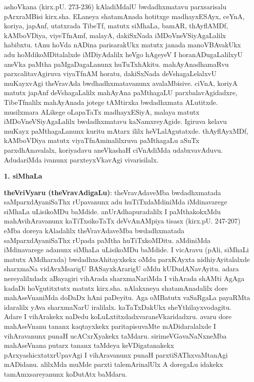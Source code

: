 ashoVkana (kirx.pU. 273-236) kAladiMdalU bwdadhxmatavu parxsarisalu pArxraMBisi kirx.sha. ELaneya shatamAnada hotitxge madhayxESAyx, ceYnA, koriya, japAnf, utatxrada TibeTf, matutx siMhaLa, bamAR, thAyflAMDf, kAMboVDiya, viyeTf\-nAmf, malayA, dakiSxNada iMDoVneVSiyAgaLalilx habibxtu. tAnu hoVda nADina pari\-sarakUkx matutx janada manoVBAvakUkx adu hoMdikoMDitalalxde iMDiyAdalilx heVgo hAgeyeV I horanADugaLalilxyU aneVka paMtha paMgaDagaLanunx huTuTx\-hAkitu. mahAyAnadhamaRvu parxcalitavAgiruva viyaTfnAM horatu, dakiSxNada deVshagaLelalxvU muKayxvAgi theVravAda bwdhadhxmatavanunx avalaMbisive. ciVnA, koriyA matutx japAnf deVshagaLalilx mahAyAna paMthagaLU parxbalavAgidadxre, TibeTfnalilx mahAyAnada jotege tAMtirxka bwdadhxmata ALutitxde. musilxmara ALikege oLapaTaTx madhayxESiyA, malaya matutx iMDoVneVSiyAgaLalilx bwdadhxmatavu kaNamxreyAgide. Igiruva kelavu muKayx paMthagaLanunx kuritu mAtarx ililx heVLalAgutatxde. thAyflAyxMDf, kAMboVDiya matutx viyaTfnAminalilxruva paMthagaLu aSuTx parxdhAnavalalx, koriyadavu aneVkashaH ciVnAdiMda udabxvavAduvu. AdudariMda ivanunx parxteyxVkavAgi vivarisilalx.

\smallskip
\begin{center}
{\textbf{\Large 1. siMhaLa}}
\end{center}

{\bf theVriVyaru (theVravAdigaLu)}: theVravAdaveMba bwdadhxmatada saMparxdAyaniSaThx rUpavanunx adu huTiTxdaMdiniMda iMdinavarege siMhaLa uLisikoMDu baMdide. anUrAdhapuradalilx I paMthakokxMdu mahAvihAravanunx kaTiTxsikoTaTx deVvAnAM\-piya tisasx (kirx.pU. 247-207) eMba doreya kAladalilx theVravAdaveMba bwdadhxmatada saMparxdAyaniSaThx rUpada paMtha huTiTxkoMDitu. aMdiniMda iMdinavarege adanunx siMhaLa uLisikoMDu baMdide. I vicAravu (pAli, siMhaLi matutx AMdharxda) bwdadhxsAhitayxkekx oMdu parxKAyxta nidhiyAyitalalxde sharxmaNa vidAvxMsarigU BASayxkArarigU oMdu kUDudANavAyitu. adara nereyalilxdadx aBayagiri vihArada sharxmaNariMda I vihArada shAMti AgAga kadaDi hoVgutitxtutx matutx kirx.sha. nAlakxneya shatamAnadalilx dore mahAseVnaniMda doDaDx hAni paDeyitu. Aga oMBatutx vaSaRgaLa payaRMta idaralilx yAva sharxmaNarU iralilalx. kaTaTxDakUkx sheYthilayxvodagitu. Adare I vihArakekx naDedu koLuLxtitxdadxvaraneVkaridadxru. avaru dore mahAseVnanu tananx kaqtayxkekx paritapisuvaMte mADidaralalxde I vihAravanunx punaH ucACxrXyakekx taMdaru. sirimeVGavaNaNxneMba mahAseVnana putarx tananx taMdeya keVDigatanakekx pArxyashicxtatxrUpavAgi I vihAravanunx punaH parxtiSAThxvaMtanAgi mADidanu. alilxMda muMde parxti talemArinalUlx A doregaLu idakekx tamAmxsareyanunx koDutAtx baMdaru.

